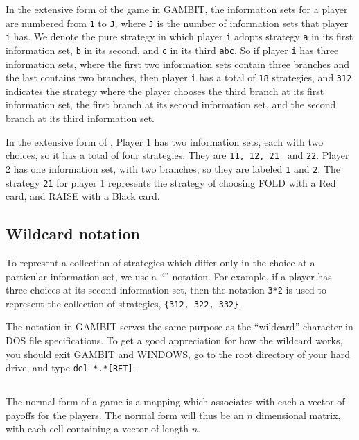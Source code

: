 In the extensive form of the game in GAMBIT, the information sets for a 
player are numbered from \verb+1+ to \verb+J+, where \verb+J+ is the number of information 
sets that player \verb+i+ has.  We denote the pure strategy in which player \verb+i+ 
adopts strategy \verb+a+ in its first information set, \verb+b+ in its second, and 
\verb+c+ in its third \verb+abc+.  So if player \verb+i+ has three information sets, where 
the first two information sets contain three branches and the last contains 
two branches, then player \verb+i+ has a total of \verb+18+ strategies, 
and \verb+312+ indicates the strategy where the player chooses the third 
branch at its first information set, the first branch at its second 
information set, and the second branch at its third information set.  

In the extensive form of ,
Player 1 has two information sets, each with two choices, so it has a
total of four strategies.  They are {\tt 11, 12, 21 } and {\tt 22}.
Player 2 has one information set, with two branches, so they are
labeled {\tt 1} and {\tt 2}.  The strategy {\tt 21} for player 1
represents the strategy of choosing FOLD with a Red card, and RAISE
with a Black card.
 
\subsection{Wildcard notation}
To represent a collection of strategies which differ only in the choice at
a particular information set, we use a ``'' 
notation.  For example,
if a player has three choices at its second information set, then the 
notation {\tt 3*2} is used to represent the collection of strategies, 
{\tt \{312, 322, 332\}}.  

The {\tt *} notation in GAMBIT serves the same purpose as the ``wildcard'' 
character in DOS file specifications.  To get a good appreciation for how 
the wildcard works, you should exit GAMBIT and WINDOWS, go to the root 
directory of your hard drive, and type \verb+del *.*[RET]+.

\subsection{}\label{normformsec}
The normal form of a game is a mapping which associates with 
each  a vector of
 payoffs for the players.  The normal form will thus be an $n$ dimensional 
matrix, with each cell containing a vector of length $n$.

